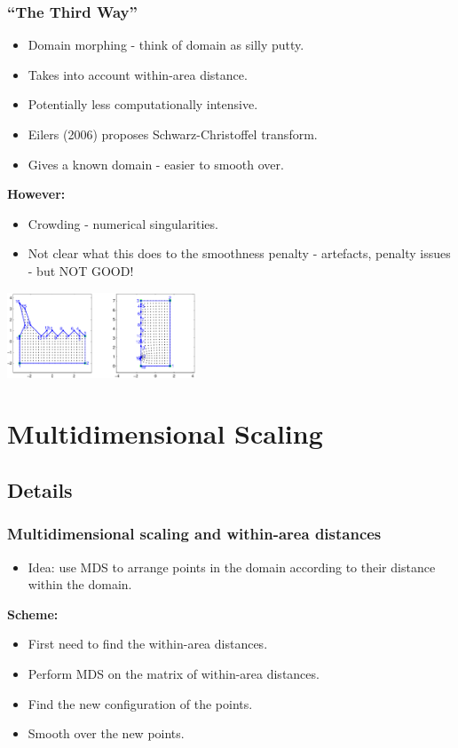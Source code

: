 \documentclass[ignorenonframetext]{beamer} %
\newcommand{\bc}{\begin{center}}
\newcommand{\ec}{\end{center}}
\newcommand{\bi}{\begin{itemize}}
\newcommand{\ei}{\end{itemize}}
\begin{document}
\begin{frame}
	\frametitle{``The Third Way''}
      \bi
         \item Domain morphing - think of domain as silly putty.
         \item Takes into account within-area distance.
         \item Potentially less computationally intensive. 
         \item Eilers (2006) proposes Schwarz-Christoffel transform.
         \item Gives a known domain - easier to smooth over.
      \ei
      \bc
         \textbf{However:}
      \ec
      \bi
         \item Crowding - numerical singularities.
         \item Not clear what this does to the smoothness penalty - artefacts, penalty issues - but NOT GOOD!
      \ei
      \bc
         \includegraphics[height=1in]{figs/matlab-test-3}
      \ec
\end{frame}



\section{Multidimensional Scaling}

\subsection{Details}

\begin{frame}
	\frametitle{Multidimensional scaling and within-area distances}
       \bi
         \item Idea: use MDS to arrange points in the domain according to their distance within the domain.
         \ei
         \bc \textbf{Scheme:} \ec
         \bi
         \item First need to find the within-area distances.
         \item Perform MDS on the matrix of within-area distances.
         \item Find the new configuration of the points.
         \item Smooth over the new points.
        \ei
\end{frame}
\end{document}
